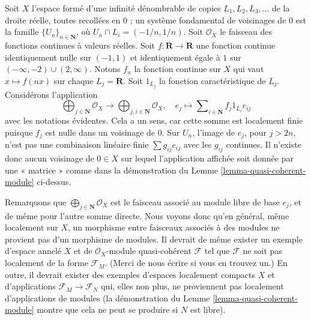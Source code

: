 \begin{example}
\label{example-quasi-coherent}
Soit $X$ l'espace formé d'une infinité dénombrable de copies
$L_1, L_2, L_3, \ldots$ de la droite réelle, toutes recollées en $0$ ;
un système fondamental de voisinages de $0$ est la famille
$\{U_n\}_{n \in \mathbf{N}}$, où $U_n \cap L_i = (-1/n, 1/n)$.
Soit $\mathcal{O}_X$ le faisceau des fonctions continues à valeurs réelles.
Soit $f : \mathbf{R} \to \mathbf{R}$ une fonction continue
identiquement nulle sur $(-1, 1)$ et identiquement égale à $1$
sur $(-\infty, -2) \cup (2, \infty)$. Notons $f_n$ la fonction continue
sur $X$ qui vaut $x \mapsto f(nx)$ sur chaque
$L_j = \mathbf{R}$. Soit $1_{L_j}$ la fonction caractéristique
de $L_j$. Considérons l'application
$$
\bigoplus\nolimits_{j \in \mathbf{N}}
\mathcal{O}_X
\longrightarrow
\bigoplus\nolimits_{j, i \in \mathbf{N}}
\mathcal{O}_X, \quad
e_j \longmapsto \sum\nolimits_{i \in \mathbf{N}} f_j 1_{L_i} e_{ij}
$$
avec les notations évidentes. Cela a un sens, car cette somme est localement
finie puisque $f_j$ est nulle dans un voisinage de $0$. Sur $U_n$,
l'image de $e_j$, pour $j > 2n$, n'est pas une combinaison linéaire finie
$\sum g_{ij} e_{ij}$ avec les $g_{ij}$ continues. Il n'existe donc
aucun voisinage de $0 \in X$ sur lequel l'application affichée soit donnée par
une « matrice » comme dans la démonstration du Lemme
\ref{lemma-quasi-coherent-module} ci-dessus.

\medskip\noindent
Remarquons que $\bigoplus\nolimits_{j \in \mathbf{N}} \mathcal{O}_X$
est le faisceau associé au module libre de base $e_j$,
et de même pour l'autre somme directe. Nous voyons donc qu'en général,
même localement sur $X$, un morphisme entre faisceaux associés à des modules
ne provient pas d'un morphisme de modules.
Il devrait de même exister un exemple d'espace annelé $X$
et de $\mathcal{O}_X$-module quasi-cohérent $\mathcal{F}$
tel que $\mathcal{F}$ ne soit pas localement de la forme $\mathcal{F}_M$.
(Merci de nous écrire si vous en trouvez un.)
En outre, il devrait exister des exemples d'espaces localement compacts
$X$ et d'applications $\mathcal{F}_M \to \mathcal{F}_N$ qui, elles non plus,
ne proviennent pas localement d'applications de modules (la démonstration du
Lemme \ref{lemma-quasi-coherent-module} montre que cela ne peut se produire
si $N$ est libre).
\end{example}












